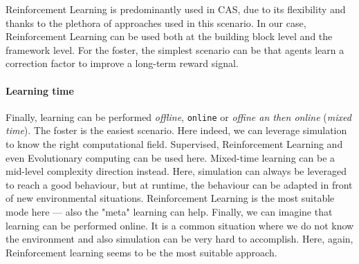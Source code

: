 \documentclass[conference]{IEEEtran}
\begin{document}
Reinforcement Learning is predominantly used in CAS, 
 due to its flexibility and thanks to the plethora of approaches used in this scenario.
% 
In our case, Reinforcement Learning can be used both at the building block level and the framework level.
%
For the foster, the simplest scenario can be that agents learn a correction factor to improve a long-term reward signal.
 
\paragraph{Learning time}
Finally, learning can be performed \textit{offline}, \texttt{online} or \textit{offine an then online} (\textit{mixed time}).
% 
The foster is the easiest scenario.
 Here indeed, we can leverage simulation to know the right computational field.
% 
Supervised, Reinforcement Learning and even Evolutionary computing can be used here.
%
Mixed-time learning can be a mid-level complexity direction instead.
 Here, simulation can always be leveraged to reach a good behaviour, but at runtime, the behaviour can be adapted in front of new environmental situations. 
%
Reinforcement Learning is the most suitable mode here --- also the "meta" learning can help.
%
Finally, we can imagine that learning can be performed online. 
 It is a common situation where we do not know the environment and also simulation can be very hard to accomplish. 
 Here, again, Reinforcement learning seems to be the most suitable approach.
\end{document}
